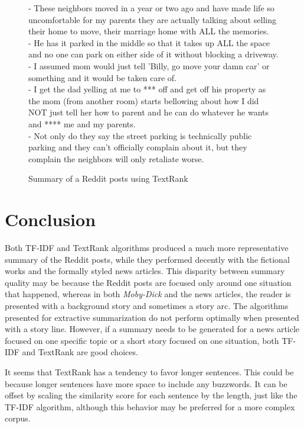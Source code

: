 \documentclass{article}[10]
\begin{document}
\begin{figure}
    \begin{framed}
        - These neighbors moved in a year or two ago and have made life so uncomfortable for my parents they are actually talking about selling their home to move, their marriage home with ALL the memories.\\
        - He has it parked in the middle so that it takes up ALL the space and no one can park on either side of it without blocking a driveway.\\
        - I assumed mom would just tell 'Billy, go move your damn car' or something and it would be taken care of.\\
        - I get the dad yelling at me to *** off and get off his property as the mom (from another room) starts bellowing about how I did NOT just tell her how to parent and he can do whatever he wants and **** me and my parents.\\
        - Not only do they say the street parking is technically public parking and they can't officially complain about it, but they complain the neighbors will only retaliate worse.\\
        \caption{Summary of a Reddit posts using TextRank}
        \label{results-textrank-reddit}
    \end{framed}
\end{figure}

\flushbottom

\section{Conclusion}
Both TF-IDF and TextRank algorithms produced a much more representative summary of the Reddit posts, while they performed decently with the fictional works and the formally styled news articles. This disparity between summary quality may be because the Reddit posts are focused only around one situation that happened, whereas in both \textit{Moby-Dick} and the news articles, the reader is presented with a background story and sometimes a story arc. The algorithms presented for extractive summarization do not perform optimally when presented with a story line. However, if a summary needs to be generated for a news article focused on one specific topic or a short story focused on one situation, both TF-IDF and TextRank are good choices.

It seems that TextRank has a tendency to favor longer sentences. This could be because longer sentences have more space to include any buzzwords. It can be offset by scaling the similarity score for each sentence by the length, just like the TF-IDF algorithm, although this behavior may be preferred for a more complex corpus.
\end{document}
